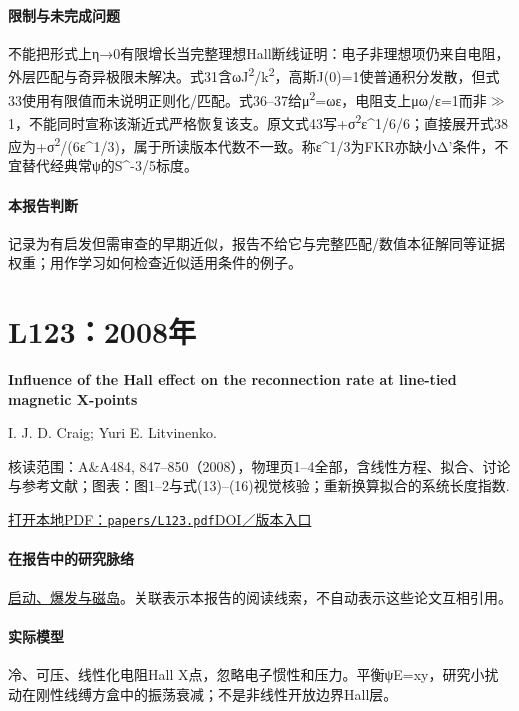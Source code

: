 \documentclass[UTF8,a4paper,11pt,openany,fontset=fandol]{ctexbook}
\begin{document}
\paragraph{限制与未完成问题}不能把形式上η→0有限增长当完整理想Hall断线证明：电子非理想项仍来自电阻，外层匹配与奇异极限未解决。式31含ωJ\textsuperscript{2}/k\textsuperscript{2}，高斯J(0)=1使普通积分发散，但式33使用有限值而未说明正则化/匹配。式36–37给μ\textsuperscript{2}=ωε，电阻支上μω/ε=1而非\ensuremath{\gg}1，不能同时宣称该渐近式严格恢复该支。原文式43写+σ\textsuperscript{2}ε\textasciicircum{}1/6/6；直接展开式38应为+σ\textsuperscript{2}/(6ε\textasciicircum{}1/3)，属于所读版本代数不一致。称ε\textasciicircum{}1/3为FKR亦缺小Δ'条件，不宜替代经典常ψ的S\textasciicircum{}-3/5标度。

\paragraph{本报告判断}记录为有启发但需审查的早期近似，报告不给它与完整匹配/数值本征解同等证据权重；用作学习如何检查近似适用条件的例子。

\section{L123：2008年}\label{paper:L123}

\textbf{Influence of the Hall effect on the reconnection rate at line-tied magnetic X-points}\citep{L123}\

I. J. D. Craig;  Yuri E. Litvinenko.

\textsf{核读范围：}A\&A484, 847–850（2008），物理页1–4全部，含线性方程、拟合、讨论与参考文献；\textsf{图表：}图1–2与式(13)–(16)视觉核验；重新换算拟合的系统长度指数.

\href{run:../papers/L123.pdf}{打开本地PDF：\texttt{papers/L123.pdf}}\quad\href{https://doi.org/10.1051/0004-6361:200809569}{DOI／版本入口}

\paragraph{在报告中的研究脉络}\hyperref[story:onset]{启动、爆发与磁岛}。关联表示本报告的阅读线索，不自动表示这些论文互相引用。

\paragraph{实际模型}冷、可压、线性化电阻Hall X点，忽略电子惯性和压力。平衡ψE=xy，研究小扰动在刚性线缚方盒中的振荡衰减；不是非线性开放边界Hall层。
\end{document}
